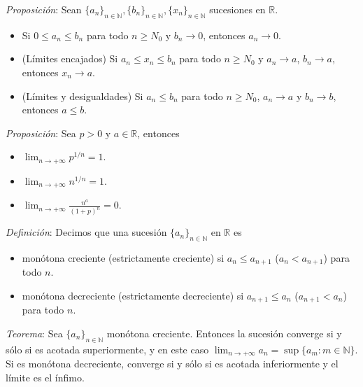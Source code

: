 \documentclass{beamer}
\begin{document}
  \begin{frame}
    \textit{Proposición}: Sean $\{a_n\}_{n \in \mathbb{N}}, \{b_n\}_{n \in \mathbb{N}},
    \{x_n\}_{n \in \mathbb{N}}$ sucesiones en $\mathbb{R}$.
    \pause
    \begin{itemize}[<+->]
      \item Si $0 \leq a_n \leq b_n$ para todo $n \geq N_0$ y $b_n \to 0$, entonces
      $a_n \to 0$.
      \item (Límites encajados) Si $a_n \leq x_n \leq b_n$ para todo $n \geq N_0$ y
      $a_n \to a$, $b_n \to a$, entonces $x_n \to a$.
      \item (Límites y desigualdades) Si $a_n \leq b_n$ para todo $n \geq N_0$,
      $a_n \to a$ y $b_n \to b$, entonces $a \leq b$.
    \end{itemize}
  \end{frame}

  \begin{frame}
    \textit{Proposición}: Sea $p > 0$ y $a \in \mathbb{R}$, entonces
    \pause
    \begin{itemize}[<+->]
      \item $\lim_{n \to +\infty} p^{1/n} = 1$.
      \item $\lim_{n \to +\infty} n^{1/n} = 1$.
      \item $\lim_{n \to +\infty} \frac{n^a}{(1 + p)^n} = 0$.
    \end{itemize}
  \end{frame}

  \begin{frame}
    \textit{Definición}: Decimos que una sucesión $\{a_n\}_{n \in \mathbb{N}}$ en
    $\mathbb{R}$ es
    \begin{itemize}[<+->]
      \item monótona creciente (estrictamente creciente) si $a_n \leq a_{n+1}$
      ($a_n < a_{n+1}$) para todo $n$.
      \item monótona decreciente (estrictamente decreciente) si
      $a_{n+1} \leq a_n$ ($a_{n+1} < a_n$) para todo $n$.
    \end{itemize}
    \pause

    \textit{Teorema}: Sea $\{a_n\}_{n \in \mathbb{N}}$ monótona creciente. Entonces
    la sucesión converge si y sólo si es acotada superiormente, y en este caso
    $\lim_{n \to +\infty} a_n = \sup \{a_m : m \in \mathbb{N}\}$.
    Si es monótona decreciente, converge si y sólo si es acotada inferiormente y
    el límite es el ínfimo.
  \end{frame}
\end{document}
